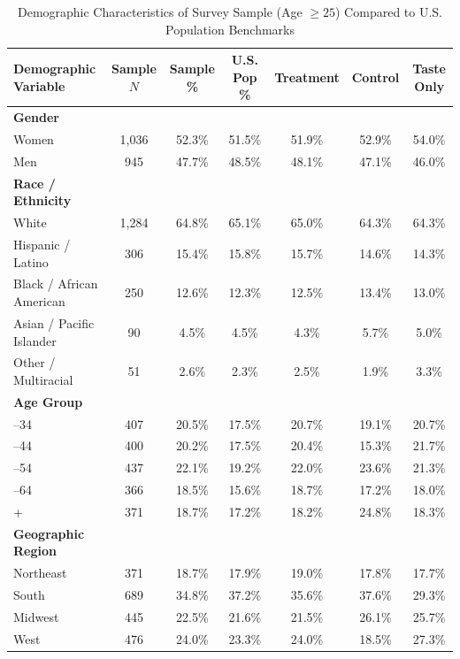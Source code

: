 \documentclass[12pt, letterpaper]{article}
\begin{document}
\begin{table}[ht!]
\centering
\small
\caption{Demographic Characteristics of Survey Sample (Age $\ge 25$) Compared to U.S. Population Benchmarks}
\label{tbl:descriptives}
\setlength{\tabcolsep}{2.5pt}
\begin{tabular*}{\linewidth}{@{\extracolsep{\fill}}lcccccc@{}}
\toprule
Demographic Variable & Sample $N$ & Sample \% & U.S. Pop \% & Treatment & Control & Taste Only \\
\midrule
\textbf{Gender} & & & & & & \\
\quad Women & 1,036 & 52.3\% & 51.5\% & 51.9\% & 52.9\% & 54.0\% \\
\quad Men & 945 & 47.7\% & 48.5\% & 48.1\% & 47.1\% & 46.0\% \\
\addlinespace[3pt]
\textbf{Race / Ethnicity} & & & & & & \\
\quad White & 1,284 & 64.8\% & 65.1\% & 65.0\% & 64.3\% & 64.3\% \\
\quad Hispanic / Latino & 306 & 15.4\% & 15.8\% & 15.7\% & 14.6\% & 14.3\% \\
\quad Black / African American & 250 & 12.6\% & 12.3\% & 12.5\% & 13.4\% & 13.0\% \\
\quad Asian / Pacific Islander & 90 & 4.5\% & 4.5\% & 4.3\% & 5.7\% & 5.0\% \\
\quad Other / Multiracial & 51 & 2.6\% & 2.3\% & 2.5\% & 1.9\% & 3.3\% \\
\addlinespace[3pt]
\textbf{Age Group} & & & & & & \\
\quad 25--34 & 407 & 20.5\% & 17.5\% & 20.7\% & 19.1\% & 20.7\% \\
\quad 35--44 & 400 & 20.2\% & 17.5\% & 20.4\% & 15.3\% & 21.7\% \\
\quad 45--54 & 437 & 22.1\% & 19.2\% & 22.0\% & 23.6\% & 21.3\% \\
\quad 55--64 & 366 & 18.5\% & 15.6\% & 18.7\% & 17.2\% & 18.0\% \\
\quad 65+ & 371 & 18.7\% & 17.2\% & 18.2\% & 24.8\% & 18.3\% \\
\addlinespace[3pt]
\textbf{Geographic Region} & & & & & & \\
\quad Northeast & 371 & 18.7\% & 17.9\% & 19.0\% & 17.8\% & 17.7\% \\
\quad South & 689 & 34.8\% & 37.2\% & 35.6\% & 37.6\% & 29.3\% \\
\quad Midwest & 445 & 22.5\% & 21.6\% & 21.5\% & 26.1\% & 25.7\% \\
\quad West & 476 & 24.0\% & 23.3\% & 24.0\% & 18.5\% & 27.3\% \\

\end{tabular*}
\end{table}
\end{document}
